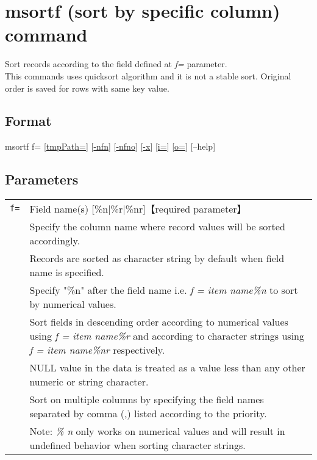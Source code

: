 \documentclass[a4paper]{jarticle}
\begin{document}
\setlength{\baselineskip}{4mm}

\section*{msortf (sort by specific column) command}
Sort records according to the field defined at \emph{f=} parameter.\\
This commands uses quicksort algorithm and it is not a stable sort. Original order is saved for rows with same key value.  \\

\subsection*{Format}
msortf f=  
[\href{run:option.pdf}{tmpPath=}] 
[\href{run:option.pdf}{-nfn}] 
[\href{run:option.pdf}{-nfno}] 
[\href{run:option.pdf}{-x}] 
[\href{run:option.pdf}{i=}] 
[\href{run:option.pdf}{o=}] 
[--help]\\

\subsection*{Parameters}
\begin{table}[htbp]
{\small
\begin{tabular}{ll}
\verb|f=|    & Field name(s) [\%n$|$\%r$|$\%nr]【required parameter】\\
& Specify the column name where record values will be sorted accordingly. \\
& Records are sorted as character string by default when field name is specified.\\
& Specify "\%n" after the field name i.e. \emph{f = item name\%n} to sort by numerical values.\\
& Sort fields in descending order according to numerical values using \emph{f = item name\%r} and according to character strings using \emph{f = item name\%nr} respectively.  \\
& NULL value in the data is treated as a value less than any other numeric or string character.\\
& Sort on multiple columns by specifying the field names separated by comma (,) listed according to the priority. \\
& Note: \emph{\% n} only works on numerical values and will result in undefined behavior when sorting character strings. \\
\end{tabular} 
}
\end{table} 
\end{document}
